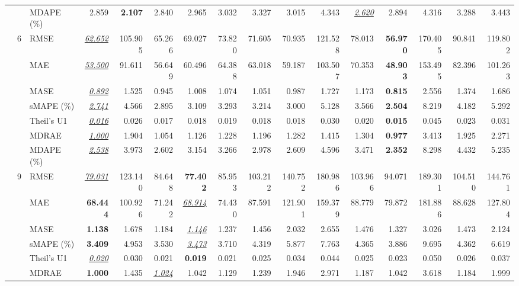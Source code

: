 \begin{table}[!htbp]
{\begin{tabular}{lllrrrrrrrrrrrrr}
 &  & MDAPE (\%) & 2.859 & \textbf{2.107} & 2.840 & 2.965 & 3.032 & 3.327 & 3.015 & 4.343 & \underline{\textit{2.620}} & 2.894 & 4.316 & 3.288 & 3.443 \\
\cmidrule(lr){2-16}
 & 6 & RMSE & \underline{\textit{62.652}} & 105.905 & 65.266 & 69.027 & 73.820 & 71.605 & 70.935 & 121.528 & 78.013 & \textbf{56.970} & 170.405 & 90.841 & 119.802 \\
 &  & MAE & \underline{\textit{53.500}} & 91.611 & 56.649 & 60.496 & 64.388 & 63.018 & 59.187 & 103.507 & 70.353 & \textbf{48.903} & 153.495 & 82.396 & 101.263 \\
 &  & MASE & \underline{\textit{0.892}} & 1.525 & 0.945 & 1.008 & 1.074 & 1.051 & 0.987 & 1.727 & 1.173 & \textbf{0.815} & 2.556 & 1.374 & 1.686 \\
 &  & sMAPE (\%) & \underline{\textit{2.741}} & 4.566 & 2.895 & 3.109 & 3.293 & 3.214 & 3.000 & 5.128 & 3.566 & \textbf{2.504} & 8.219 & 4.182 & 5.292 \\
 &  & Theil's U1 & \underline{\textit{0.016}} & 0.026 & 0.017 & 0.018 & 0.019 & 0.018 & 0.018 & 0.030 & 0.020 & \textbf{0.015} & 0.045 & 0.023 & 0.031 \\
 &  & MDRAE & \underline{\textit{1.000}} & 1.904 & 1.054 & 1.126 & 1.228 & 1.196 & 1.282 & 1.415 & 1.304 & \textbf{0.977} & 3.413 & 1.925 & 2.271 \\
 &  & MDAPE (\%) & \underline{\textit{2.538}} & 3.973 & 2.602 & 3.154 & 3.266 & 2.978 & 2.609 & 4.596 & 3.471 & \textbf{2.352} & 8.298 & 4.432 & 5.235 \\
\cmidrule(lr){2-16}
 & 9 & RMSE & \underline{\textit{79.031}} & 123.140 & 84.648 & \textbf{77.402} & 85.953 & 103.212 & 140.752 & 180.986 & 103.966 & 94.071 & 189.301 & 104.510 & 144.761 \\
 &  & MAE & \textbf{68.444} & 100.926 & 71.242 & \underline{\textit{68.914}} & 74.430 & 87.591 & 121.901 & 159.379 & 88.779 & 79.872 & 181.886 & 88.628 & 127.804 \\
 &  & MASE & \textbf{1.138} & 1.678 & 1.184 & \underline{\textit{1.146}} & 1.237 & 1.456 & 2.032 & 2.655 & 1.476 & 1.327 & 3.026 & 1.473 & 2.124 \\
 &  & sMAPE (\%) & \textbf{3.409} & 4.953 & 3.530 & \underline{\textit{3.473}} & 3.710 & 4.319 & 5.877 & 7.763 & 4.365 & 3.886 & 9.695 & 4.362 & 6.619 \\
 &  & Theil's U1 & \underline{\textit{0.020}} & 0.030 & 0.021 & \textbf{0.019} & 0.021 & 0.025 & 0.034 & 0.044 & 0.025 & 0.023 & 0.050 & 0.026 & 0.037 \\
 &  & MDRAE & \textbf{1.000} & 1.435 & \underline{\textit{1.024}} & 1.042 & 1.129 & 1.239 & 1.946 & 2.971 & 1.187 & 1.042 & 3.618 & 1.184 & 1.999 \\

\end{tabular}}
\end{table}
